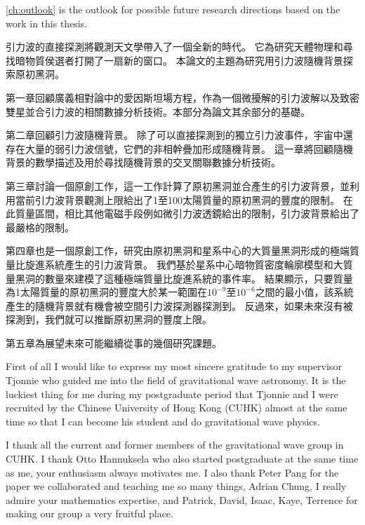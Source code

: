 \cref{ch:outlook} is the outlook for possible future research directions based on the work in this thesis.

\newpage
\pagestyle{myheadings}

 \vspace{1.2cm}

引力波的直接探測將觀測天文學帶入了一個全新的時代。
它為研究天體物理和尋找暗物質侯選者打開了一扇新的窗口。
本論文的主題為研究用引力波隨機背景探索原初黑洞。

第一章回顧廣義相對論中的愛因斯坦場方程，作為一個微擾解的引力波解以及致密雙星並合引力波的相關數據分析技術。本部分為論文其余部分的基礎。

第二章回顧引力波隨機背景。
除了可以直接探測到的獨立引力波事件，宇宙中還存在大量的弱引力波信號，它們的非相幹疊加形成隨機背景。
這一章將回顧隨機背景的數學描述及用於尋找隨機背景的交叉關聯數據分析技術。

第三章討論一個原創工作，這一工作計算了原初黑洞並合產生的引力波背景，並利用當前引力波背景觀測上限給出了1至100太陽質量的原初黑洞的豐度的限制。
在此質量區間，相比其他電磁手段例如微引力波透鏡給出的限制，引力波背景給出了最嚴格的限制。

第四章也是一個原創工作，研究由原初黑洞和星系中心的大質量黑洞形成的極端質量比旋進系統產生的引力波背景。
我們基於星系中心暗物質密度輪廓模型和大質量黑洞的數量來建模了這種極端質量比旋進系統的事件率。
結果顯示，只要質量為1太陽質量的原初黑洞的豐度大於某一範圍在$10^{-9}$至$10^{-6}$之間的最小值，該系統產生的隨機背景就有機會被空間引力波探測器探測到。
反過來，如果未來沒有被探測到，我們就可以推斷原初黑洞的豐度上限。

第五章為展望未來可能繼續從事的幾個研究課題。



\newpage
{} \vspace{1.2cm}

First of all I would like to express my most sincere gratitude to my supervisor Tjonnie who guided me into the field of gravitational wave astronomy.
It is the luckiest thing for me during my postgraduate period that Tjonnie and I were recruited by the Chinese University of Hong Kong (CUHK) almost at the same time so that I can become his student and do gravitational wave physics.

I thank all the current and former members of the gravitational wave group in CUHK.
I thank Otto Hannuksela who also started postgraduate at the same time as me, your enthusiasm always motivates me. 
I also thank Peter Pang for the paper we collaborated and teaching me so many things, Adrian Chung, I really admire your mathematics expertise, and Patrick, David, Isaac, Kaye, Terrence for making our group a very fruitful place.


